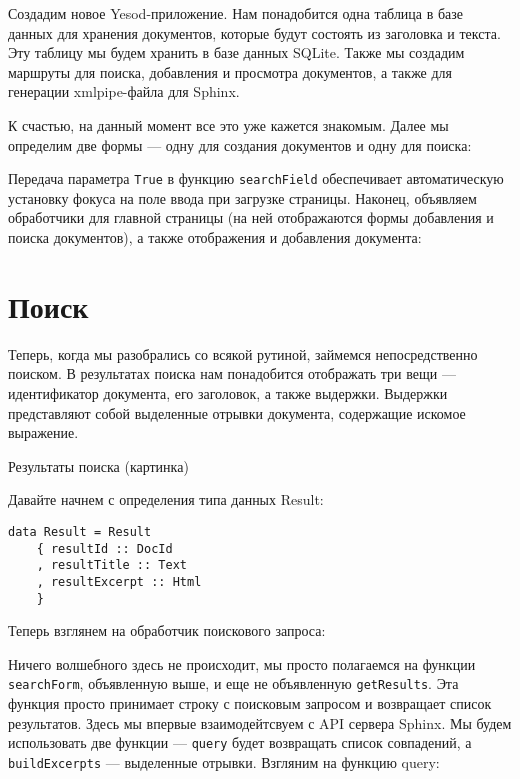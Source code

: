 
Создадим новое Yesod-приложение. Нам понадобится одна таблица в базе данных для хранения документов, которые будут состоять из заголовка и текста. Эту таблицу мы будем хранить в базе данных SQLite. Также мы создадим маршруты для поиска, добавления и просмотра документов, а также для генерации xmlpipe-файла для Sphinx.



К счастью, на данный момент все это уже кажется знакомым. Далее мы определим две формы --- одну для создания документов и одну для поиска:



Передача параметра \lstinline'True' в функцию \lstinline'searchField' обеспечивает автоматическую установку фокуса на поле ввода при загрузке страницы. Наконец, объявляем обработчики для главной страницы (на ней отображаются формы добавления и поиска документов), а также отображения и добавления документа:



\section{Поиск} %

Теперь, когда мы разобрались со всякой рутиной, займемся непосредственно поиском. В результатах поиска нам понадобится отображать три вещи --- идентификатор документа, его заголовок, а также выдержки. Выдержки представляют собой выделенные отрывки документа, содержащие искомое выражение.

Результаты поиска (картинка)

Давайте начнем с определения типа данных Result:

\begin{lstlisting}
data Result = Result
    { resultId :: DocId
    , resultTitle :: Text
    , resultExcerpt :: Html
    }
\end{lstlisting}

Теперь взглянем на обработчик поискового запроса:




Ничего волшебного здесь не происходит, мы просто полагаемся на функции \lstinline'searchForm', объявленную выше, и еще не объявленную \lstinline'getResults'. Эта функция просто принимает строку с поисковым запросом и возвращает список результатов. Здесь мы впервые взаимодейтсвуем с API сервера Sphinx. Мы будем использовать две функции --- \lstinline'query' будет возвращать список совпадений, а \lstinline'buildExcerpts' --- выделенные отрывки. Взгляним на функцию query:

